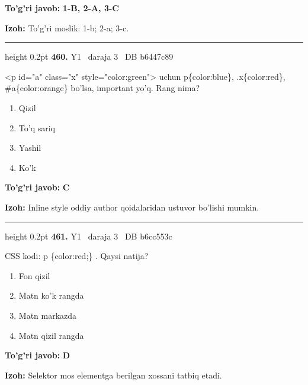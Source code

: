 \documentclass[10pt,a4paper,oneside]{article}
\begin{document}
\begin{tcolorbox}[enhanced,breakable,colback=teal!4,colframe=teal!45!black,boxrule=0.45pt,arc=1.2mm,left=2.8mm,right=2.8mm,top=2mm,bottom=2mm,before skip=2mm,after skip=2mm]
\textbf{\color{teal}To'g'ri javob:} \textbf{1-B, 2-A, 3-C}
\par\smallskip
\textbf{Izoh:} To'g'ri moslik: 1-b; 2-a; 3-c.
\end{tcolorbox}
\vspace{2mm}\hrule height 0.2pt \vspace{4mm}
\hypertarget{q460}{\textbf{\color{ink}460.}}  {\color{muted}\scriptsize Y1 \textbullet\ daraja 3 \textbullet\ DB b6447c89}
\par
\textless{}p id="a" class="x" style="color:green"\textgreater{} uchun p\{color:blue\}, .x\{color:red\}, \#a\{color:orange\} bo'lsa, important yo'q. Rang nima?
\begin{enumerate}[label=\Alph*),leftmargin=9mm]
\item Qizil
\item To'q sariq
\item Yashil
\item Ko'k
\end{enumerate}
\begin{tcolorbox}[enhanced,breakable,colback=teal!4,colframe=teal!45!black,boxrule=0.45pt,arc=1.2mm,left=2.8mm,right=2.8mm,top=2mm,bottom=2mm,before skip=2mm,after skip=2mm]
\textbf{\color{teal}To'g'ri javob:} \textbf{C}
\par\smallskip
\textbf{Izoh:} Inline style oddiy author qoidalaridan ustuvor bo'lishi mumkin.
\end{tcolorbox}
\vspace{2mm}\hrule height 0.2pt \vspace{4mm}
\hypertarget{q461}{\textbf{\color{ink}461.}}  {\color{muted}\scriptsize Y1 \textbullet\ daraja 3 \textbullet\ DB b6cc553c}
\par
CSS kodi: p \{color:red;\} . Qaysi natija?
\begin{enumerate}[label=\Alph*),leftmargin=9mm]
\item Fon qizil
\item Matn ko'k rangda
\item Matn markazda
\item Matn qizil rangda
\end{enumerate}
\begin{tcolorbox}[enhanced,breakable,colback=teal!4,colframe=teal!45!black,boxrule=0.45pt,arc=1.2mm,left=2.8mm,right=2.8mm,top=2mm,bottom=2mm,before skip=2mm,after skip=2mm]
\textbf{\color{teal}To'g'ri javob:} \textbf{D}
\par\smallskip
\textbf{Izoh:} Selektor mos elementga berilgan xossani tatbiq etadi.
\end{tcolorbox}
\end{document}
